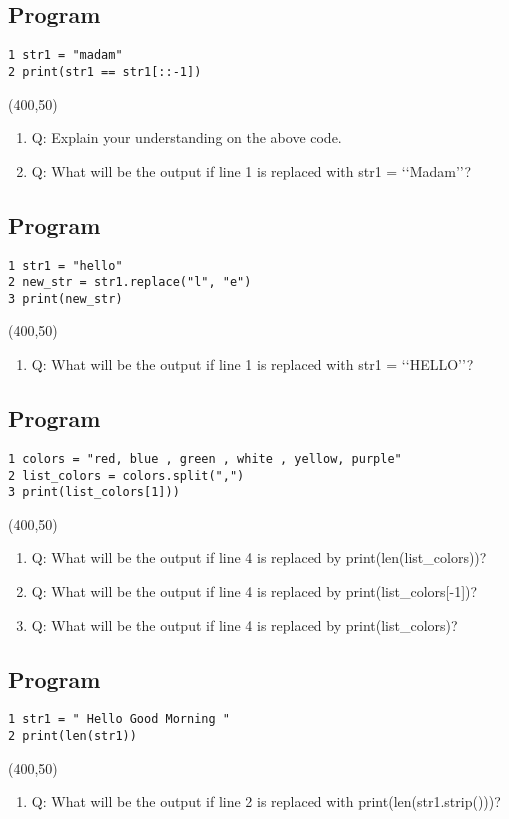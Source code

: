 \documentclass{book}
\begin{document}
\subsection{Program}
\begin{verbatim}
1 str1 = "madam"
2 print(str1 == str1[::-1])
\end{verbatim}
\framebox(400,50){}

\begin{enumerate}
\item{Q: Explain your understanding on the above code.}
\item{Q: What will be the output if line 1 is replaced with str1 = ‘‘Madam’’?}
\end{enumerate}

\subsection{Program}
\begin{verbatim}
1 str1 = "hello"
2 new_str = str1.replace("l", "e")
3 print(new_str)
\end{verbatim}
\framebox(400,50){}

\begin{enumerate}
\item{Q: What will be the output if line 1 is replaced with str1 = ‘‘HELLO’’?}
\end{enumerate}

\subsection{Program}
\begin{verbatim}
1 colors = "red, blue , green , white , yellow, purple"
2 list_colors = colors.split(",")
3 print(list_colors[1]))
\end{verbatim}
\framebox(400,50){}

\begin{enumerate}
\item{Q: What will be the output if line 4 is replaced by print(len(list{\_}colors))?}
\item{Q: What will be the output if line 4 is replaced by print(list{\_}colors[-1])?}
\item{Q: What will be the output if line 4 is replaced by print(list{\_}colors)?}
\end{enumerate}

\subsection{Program}
\begin{verbatim}
1 str1 = " Hello Good Morning "
2 print(len(str1))
\end{verbatim}
\framebox(400,50){}
\begin{enumerate}
\item{Q: What will be the output if line 2 is replaced with print(len(str1.strip()))?}
\end{enumerate}
\end{document}
